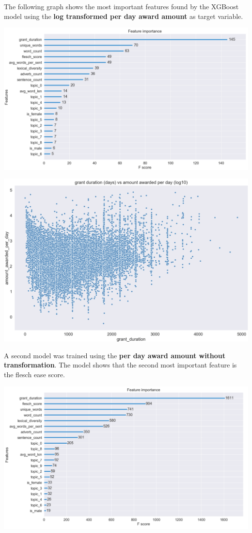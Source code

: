 \documentclass[11pt, oneside]{article}   	%
\begin{document}
The following graph shows the most important features found by the XGBoost model using the \textbf{ log transformed per day award amount} as target variable. 

 \includegraphics[width=\textwidth]{xgbLogAwardPerDay}
 
  \includegraphics[width=\textwidth]{xgbScatterAwardPerDay}

A second model was trained using the \textbf{per day award amount without transformation}. The model shows that the second most important feature is the flesch ease score.

\includegraphics[width=\textwidth]{xgbAwardPerDay}
\end{document}
